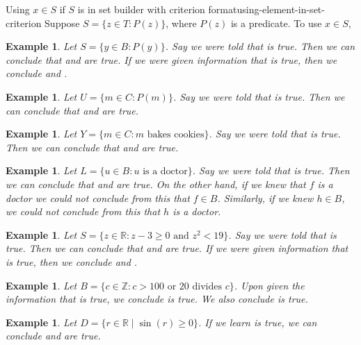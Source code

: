 \documentclass{book}
\newcounter{ekcounter}%
\theoremstyle{ekimcustom}
\newtheorem{example}[ekcounter]{Example}
\begin{document}
\begin{bmethod}{Using $x \in S$ if $S$ is in set builder with criterion format}{using-element-in-set-criterion}
Suppose $S = \{z \in T : P(z)\}$, where $P(z)$ is a predicate. To use $x \in S$,
\begin{center}
\end{center}
\end{bmethod}

\begin{example}
Let $S = \{y \in B : P(y)\}$. Say we were told that  is true. Then we can conclude that  and  are true. If we were given information that  is true, then we conclude  and .
\end{example}
\begin{example}
Let $U = \{m \in C : P(m)\}$. Say we were told that  is true. Then we can conclude that  and  are true.
\end{example}
\begin{example}
Let $Y = \{m \in C : m \text{ bakes cookies}\}$. Say we were told that  is true. Then we can conclude that  and  are true.
\end{example}
\begin{example}
Let $L = \{u \in B : u \text{ is a doctor}\}$. Say we were told that  is true. Then we can conclude that  and  are true. On the other hand, if we knew that $f$ is a doctor we could not conclude from this that $f \in B$. Similarly, if we knew $h \in B$, we could not conclude from this that $h$ is a doctor.
\end{example}


\begin{example}
Let $S = \{z \in \mathbb{R} : z-3 \geq 0 \text{ and } z^2 < 19\}$. Say we were told that  is true. Then we can conclude that  and  are true. If we were given information that  is true, then we conclude  and .
\end{example}
\begin{example}
Let $B = \{c \in \mathbb{Z} : c > 100 \text{ or } 20 \text{ divides } c\}$. Upon given the information that  is true, we conclude  is true. We also conclude  is true.
\end{example}
\begin{example}
Let $D = \{r \in \mathbb{R} \mid \sin(r) \geq 0\}$. If we learn  is true, we can conclude  and  are true.
\end{example}
\end{document}
